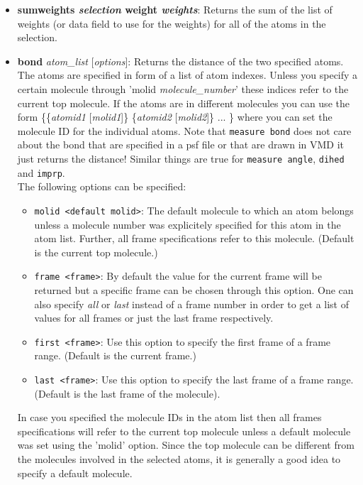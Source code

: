 \begin{itemize}
\item {\bf sumweights {\it selection} weight {\it weights}}:
  Returns the sum of the list of weights (or data field to use for
  the weights) for all of the atoms in the selection.

\item {\bf bond} {\it atom\_list} [{\it options}]:
  Returns the distance of the two specified atoms. 
  The atoms are specified in form of a list of atom indexes. Unless you specify
  a certain molecule through 'molid {\it molecule\_number}' these indices refer
  to the current top molecule. If the atoms are in different molecules you can
  use the form \{\{{\it atomid1} [{\it molid1}]\} \{{\it atomid2} [{\it molid2}]\} ... \}
  where you can set the molecule ID for the individual atoms.
  Note that {\tt measure bond} does not care about the bond that are specified in a psf file or
  that are drawn in VMD it just returns the distance! Similar things are true for 
  {\tt measure angle}, {\tt dihed} and {\tt imprp}.\\
  The following options can be specified:
  \begin{itemize}
  \item {\tt molid <default molid>}: The default molecule to which an atom belongs unless
    a molecule number was explicitely specified for this atom in the atom list. Further, all
    frame specifications refer to this molecule.
    (Default is the current top molecule.)
  \item {\tt frame <frame>}: 
    By default the value for the current frame will be
    returned but a specific frame can be chosen through this option. One can also
    specify {\it all} or {\it last} instead of a frame number in order to get a 
    list of values for all frames or just the last frame respectively.
  \item {\tt first <frame>}: Use this option to specify the first frame of a frame
    range. (Default is the current frame.)
  \item {\tt last <frame>}: Use this option to specify the last frame of a frame
    range. (Default is the last frame of the molecule).
  \end{itemize}
  In case you specified the molecule IDs in the atom list then all frames 
  specifications will refer to the current top molecule unless a default molecule 
  was set using the 'molid' option.
  Since the top molecule can be different from the molecules involved in the 
  selected atoms, it is generally a good idea to specify a default molecule.


\end{itemize}
